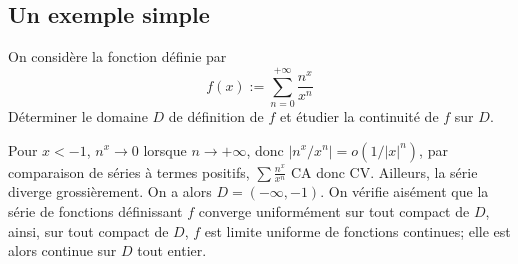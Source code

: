 \subsection{Un exemple simple}
\begin{exercice}
	On considère la fonction définie par \[f(x):=\sum_{n=0}^{+\infty}\frac{n^x}{x^n}\]
	Déterminer le domaine $D$ de définition de $f$ et étudier la continuité de $f$ sur $D$.
\end{exercice}

\begin{correction}
	Pour $x<-1$, $n^x\to 0$ lorsque $n\to+\infty$, donc $|n^x/x^n|=o(1/|x|^n)$, par comparaison de séries à termes positifs, $\sum\frac{n^x}{x^n}$ CA donc CV. 
    Ailleurs, la série diverge grossièrement. 
    On a alors $D=(-\infty,-1)$.
    On vérifie aisément que la série de fonctions définissant $f$ converge uniformément sur tout compact de $D$, 
    ainsi, sur tout compact de $D$, $f$ est limite uniforme de fonctions continues; elle est alors continue sur $D$ tout entier.
\end{correction}
